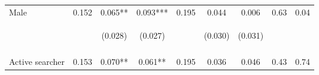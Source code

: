 \begin{table}[h!]
{\begin{tabular}{lcccccccc}
\noalign{\smallskip}Male & 0.152 & 0.065** & 0.093*** & 0.195 & 0.044 & 0.006 & 0.63 & 0.04\\
 & \begin{footnotesize}\end{footnotesize} & \begin{footnotesize}(0.028)\end{footnotesize} & \begin{footnotesize}(0.027)\end{footnotesize} & \begin{footnotesize}\end{footnotesize} & \begin{footnotesize}(0.030)\end{footnotesize} & \begin{footnotesize}(0.031)\end{footnotesize} & \begin{footnotesize}\end{footnotesize} & \begin{footnotesize}\end{footnotesize}\\
 & \begin{footnotesize}\end{footnotesize} & \begin{footnotesize}[0.021]\end{footnotesize} & \begin{footnotesize}[0.004]\end{footnotesize} & \begin{footnotesize}\end{footnotesize} & \begin{footnotesize}[0.505]\end{footnotesize} & \begin{footnotesize}[1.000]\end{footnotesize} & \begin{footnotesize}\end{footnotesize} & \begin{footnotesize}\end{footnotesize}\\
\noalign{\smallskip}Active searcher & 0.153 & 0.070** & 0.061** & 0.195 & 0.036 & 0.046 & 0.43 & 0.74\\

\end{tabular}}
\end{table}

